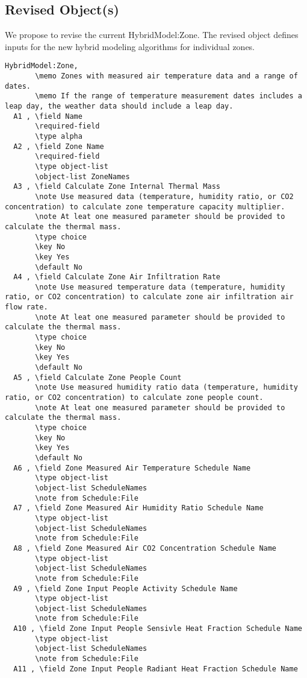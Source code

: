 \documentclass[11pt]{article}
\begin{document}
\subsection{Revised Object(s)}
We propose to revise the current HybridModel:Zone. The revised object defines inputs for the new hybrid modeling algorithms for individual zones. 
\begin{verbatim}
HybridModel:Zone,
       \memo Zones with measured air temperature data and a range of dates.
       \memo If the range of temperature measurement dates includes a leap day, the weather data should include a leap day.
  A1 , \field Name
       \required-field
       \type alpha
  A2 , \field Zone Name
       \required-field
       \type object-list
       \object-list ZoneNames
  A3 , \field Calculate Zone Internal Thermal Mass
       \note Use measured data (temperature, humidity ratio, or CO2 concentration) to calculate zone temperature capacity multiplier.
       \note At leat one measured parameter should be provided to calculate the thermal mass.
       \type choice
       \key No
       \key Yes
       \default No
  A4 , \field Calculate Zone Air Infiltration Rate
       \note Use measured temperature data (temperature, humidity ratio, or CO2 concentration) to calculate zone air infiltration air flow rate.
       \note At leat one measured parameter should be provided to calculate the thermal mass.
       \type choice
       \key No
       \key Yes
       \default No
  A5 , \field Calculate Zone People Count
       \note Use measured humidity ratio data (temperature, humidity ratio, or CO2 concentration) to calculate zone people count.
       \note At leat one measured parameter should be provided to calculate the thermal mass.
       \type choice
       \key No
       \key Yes
       \default No
  A6 , \field Zone Measured Air Temperature Schedule Name
       \type object-list
       \object-list ScheduleNames
       \note from Schedule:File
  A7 , \field Zone Measured Air Humidity Ratio Schedule Name
       \type object-list
       \object-list ScheduleNames
       \note from Schedule:File
  A8 , \field Zone Measured Air CO2 Concentration Schedule Name
       \type object-list
       \object-list ScheduleNames
       \note from Schedule:File
  A9 , \field Zone Input People Activity Schedule Name
       \type object-list
       \object-list ScheduleNames
       \note from Schedule:File
  A10 , \field Zone Input People Sensivle Heat Fraction Schedule Name
       \type object-list
       \object-list ScheduleNames
       \note from Schedule:File
  A11 , \field Zone Input People Radiant Heat Fraction Schedule Name

\end{verbatim}
\end{document}
